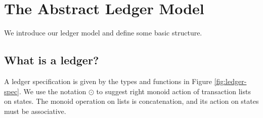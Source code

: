 \section{The Abstract Ledger Model}
\label{sec:model}

We introduce our ledger model and define some basic structure.


\subsection{What is a ledger?}
\label{sec:what}

A ledger specification is given by the types and functions in Figure \ref{fig:ledger-spec}.
We use the notation $\odot$ to suggest right monoid action of transaction lists on states.
The monoid operation on lists is concatenation, and its action on states must be
associative.

